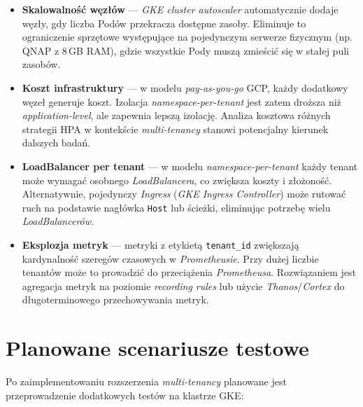 \begin{itemize}
  \item \textbf{Skalowalność węzłów} — \textit{GKE cluster autoscaler} automatycznie dodaje węzły, gdy liczba Podów przekracza dostępne zasoby. Eliminuje to ograniczenie sprzętowe występujące na pojedynczym serwerze fizycznym (np. QNAP z 8\,GB RAM), gdzie wszystkie Pody muszą zmieścić się w stałej puli zasobów.

  \item \textbf{Koszt infrastruktury} — w modelu \textit{pay-as-you-go} GCP, każdy dodatkowy węzeł generuje koszt. Izolacja \textit{namespace-per-tenant} jest zatem droższa niż \textit{application-level}, ale zapewnia lepszą izolację. Analiza kosztowa różnych strategii HPA w kontekście \textit{multi-tenancy} stanowi potencjalny kierunek dalszych badań.

  \item \textbf{LoadBalancer per tenant} — w modelu \textit{namespace-per-tenant} każdy tenant może wymagać osobnego \textit{LoadBalancera}, co zwiększa koszty i złożoność. Alternatywnie, pojedynczy \textit{Ingress} (\textit{GKE Ingress Controller}) może rutować ruch na podstawie nagłówka \texttt{Host} lub ścieżki, eliminując potrzebę wielu \textit{LoadBalancerów}.

  \item \textbf{Eksplozja metryk} — metryki z etykietą \texttt{tenant\_id} zwiększają kardynalność szeregów czasowych w \textit{Prometheusie}. Przy dużej liczbie tenantów może to prowadzić do przeciążenia \textit{Prometheusa}. Rozwiązaniem jest agregacja metryk na poziomie \textit{recording rules} lub użycie \textit{Thanos}/\textit{Cortex} do długoterminowego przechowywania metryk.
\end{itemize}

\section{Planowane scenariusze testowe}

Po zaimplementowaniu rozszerzenia \textit{multi-tenancy} planowane jest przeprowadzenie dodatkowych testów na klastrze GKE:

